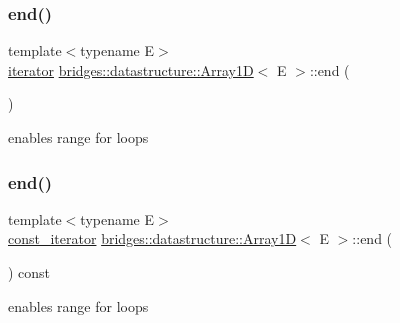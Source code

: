 \subsubsection{\texorpdfstring{end()}{end()}\hspace{0.1cm}{\footnotesize\ttfamily [1/2]}}
{\footnotesize\ttfamily template$<$typename E$>$ \\
\hyperlink{classbridges_1_1datastructure_1_1_array1_d_1_1iterator}{iterator} \hyperlink{classbridges_1_1datastructure_1_1_array1_d}{bridges\+::datastructure\+::\+Array1D}$<$ E $>$\+::end (\begin{DoxyParamCaption}{ }\end{DoxyParamCaption})\hspace{0.3cm}{\ttfamily [inline]}}



enables range for loops 

\mbox{\label{classbridges_1_1datastructure_1_1_array1_d_afa8c2d7cb3db9a506baa18d383aabdb5}} 
\subsubsection{\texorpdfstring{end()}{end()}\hspace{0.1cm}{\footnotesize\ttfamily [2/2]}}
{\footnotesize\ttfamily template$<$typename E$>$ \\
\hyperlink{classbridges_1_1datastructure_1_1_array1_d_1_1const__iterator}{const\+\_\+iterator} \hyperlink{classbridges_1_1datastructure_1_1_array1_d}{bridges\+::datastructure\+::\+Array1D}$<$ E $>$\+::end (\begin{DoxyParamCaption}{ }\end{DoxyParamCaption}) const\hspace{0.3cm}{\ttfamily [inline]}}



enables range for loops 

\mbox{\label{classbridges_1_1datastructure_1_1_array1_d_a48fbe4ee71c52303033effcd4e1369c0}} 
